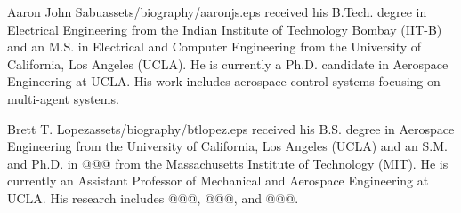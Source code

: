 \thebiography
\begin{biographywithpic}
{Aaron John Sabu}{assets/biography/aaronjs.eps}
received his B.Tech. degree in Electrical Engineering from the Indian Institute of Technology Bombay (IIT-B) and an M.S. in Electrical and Computer Engineering from the University of California, Los Angeles (UCLA). He is currently a Ph.D. candidate in Aerospace Engineering at UCLA. His work includes aerospace control systems focusing on multi-agent systems.
\end{biographywithpic} 

\begin{biographywithpic}
{Brett T. Lopez}{assets/biography/btlopez.eps}
received his B.S. degree in Aerospace Engineering from the University of California, Los Angeles (UCLA) and an S.M. and Ph.D. in @@@ from the Massachusetts Institute of Technology (MIT). He is currently an Assistant Professor of Mechanical and Aerospace Engineering at UCLA. His research includes @@@, @@@, and @@@.
\end{biographywithpic}